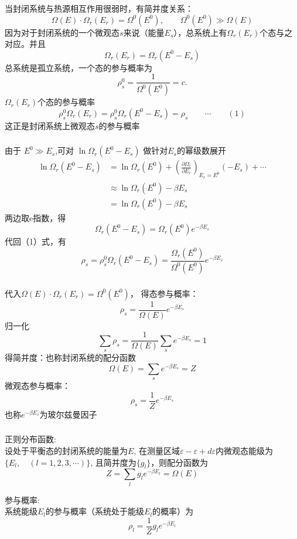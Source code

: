 \begin{frame}
  \frametitle{}
  当封闭系统与热源相互作用很弱时，有简并度关系：\[ \Omega(E) \cdot \Omega _r(E_r) = \Omega ^0 (E^0), \qquad \Omega ^0 (E^0) \gg \Omega(E)\]
  因为对于封闭系统的一个微观态$s$来说（能量$E_s$），总系统上有$\Omega _r (E_r)$个态与之对应。并且
  \[\Omega _r (E_r) = \Omega _r(E^0 - E_s) \] 
  总系统是孤立系统，一个态的参与概率为
  \[ \rho ^0 _s = \frac{1}{\Omega^0 (E^0)} =c. \]
  $\Omega _r (E_r)$个态的参与概率
  \[ \rho ^0 _s \Omega _r (E_r)  =\rho ^0 _s  \Omega _r (E^0 - E_s)  = \rho _s \qquad \cdots \qquad (1)\]
  这正是封闭系统上微观态$s$的参与概率
\end{frame} 

\begin{frame}
  \frametitle{}
由于 $ E^0 \gg E_s $,可对  $ \ln \Omega _r (E^0 - E_s) $ 做针对$ E_s$的幂级数展开
\[ 
\begin{aligned}
  \ln \Omega _r (E^0 - E_s)  &=  \ln \Omega _r (E^0) + \left(\frac{\partial \Omega _r }{\partial E_r}\right)_{E_r =E^0} (-E_s) +\cdots \\ 
  & \approx \ln \Omega _r (E^0) - \beta  E_s \\
  &= \ln \Omega _r (E^0) - \beta E_s
\end{aligned}  
\] 
两边取e指数，得
\[ \Omega _r (E^0 - E_s) = \Omega _r (E^0) e^{- \beta E_s }\]
代回（1）式，有
\[\rho _s  =\rho ^0 _s  \Omega _r (E^0 - E_s)  =  \frac{\Omega _r (E^0)}{\Omega^0 (E^0)} e^{- \beta E_s}\]
\end{frame} 

\begin{frame}
  \frametitle{}
代入$\Omega(E) \cdot \Omega _r(E_r) = \Omega ^0 (E^0)$， 得态参与概率：
\[\rho _s  =  \frac{1}{\Omega(E)} e^{- \beta E_s}\] 
归一化
\[\sum_s \rho _s  = \frac{1}{\Omega(E)} \sum_s e^{- \beta E_s} =1 \]
得简并度：也称封闭系统的配分函数
\[\Omega(E) = \sum_s e^{- \beta E_s} = Z\]
微观态参与概率：
\[\rho _s  =  \frac{1}{Z} e^{- \beta E_s}\] 
也称$ e^{- \beta E_s}  $为玻尔兹曼因子 
\end{frame} 

\begin{frame}
  \frametitle{}
  \alert{正则分布函数:} \\ 
  设处于平衡态的封闭系统的能量为$E$, 在测量区域$\varepsilon - \varepsilon+ d\varepsilon $内微观态能级为$\{ E_l, \quad (l=1,2,3,\cdots )\}$, 且简并度为$\{ g_l \}$，则配分函数为
  \[ Z= \sum_l g_l e^{- \beta E_l }  = \Omega(E)\]  

  \alert{参与概率:}  \\
  系统能级$ E_l $的参与概率（系统处于能级$ E_l $的概率）为 
  \[ \rho _l  =  \frac{1}{Z} g_l e^{- \beta E_l} \] 
\end{frame} 



